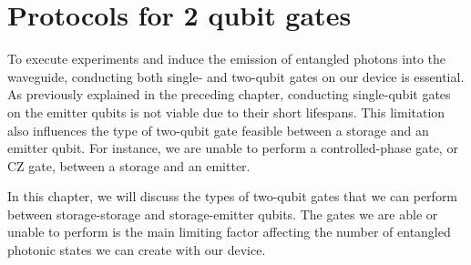 \chapter{Protocols for 2 qubit gates}
\label{chap:2_qubit_gates}

To execute experiments and induce the emission of entangled photons into the waveguide, conducting both single- and two-qubit gates on our device is essential.
As previously explained in the preceding chapter, conducting single-qubit gates on the emitter qubits is not viable due to their short lifespans.
This limitation also influences the type of two-qubit gate feasible between a storage and an emitter qubit.
For instance, we are unable to perform a controlled-phase gate, or CZ gate, between a storage and an emitter.

In this chapter, we will discuss the types of two-qubit gates that we can perform between storage-storage and storage-emitter qubits.
The gates we are able or unable to perform is the main limiting factor affecting the number of entangled photonic states we can create with our device.


